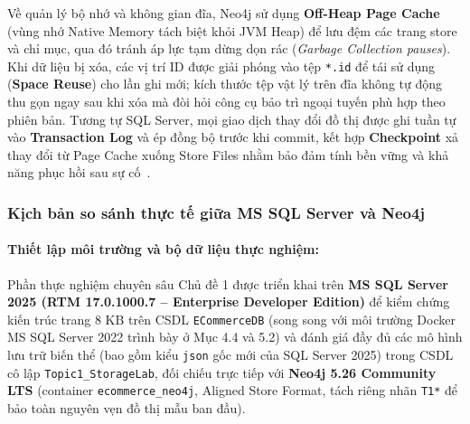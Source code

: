 Về quản lý bộ nhớ và không gian đĩa, Neo4j sử dụng \textbf{Off-Heap Page Cache} (vùng nhớ Native Memory tách biệt khỏi JVM Heap) để lưu đệm các trang store và chỉ mục, qua đó tránh áp lực tạm dừng dọn rác (\textit{Garbage Collection pauses}). Khi dữ liệu bị xóa, các vị trí ID được giải phóng vào tệp \texttt{*.id} để tái sử dụng (\textbf{Space Reuse}) cho lần ghi mới; kích thước tệp vật lý trên đĩa không tự động thu gọn ngay sau khi xóa mà đòi hỏi công cụ bảo trì ngoại tuyến phù hợp theo phiên bản. Tương tự SQL Server, mọi giao dịch thay đổi đồ thị được ghi tuần tự vào \textbf{Transaction Log} và ép đồng bộ trước khi commit, kết hợp \textbf{Checkpoint} xả thay đổi từ Page Cache xuống Store Files nhằm bảo đảm tính bền vững và khả năng phục hồi sau sự cố~\cite{t1_neo4jops}.

\subsubsection{Kịch bản so sánh thực tế giữa MS SQL Server và Neo4j}

\paragraph{Thiết lập môi trường và bộ dữ liệu thực nghiệm:}
Phần thực nghiệm chuyên sâu Chủ đề 1 được triển khai trên \textbf{MS SQL Server 2025 (RTM 17.0.1000.7 -- Enterprise Developer Edition)} để kiểm chứng kiến trúc trang 8 KB trên CSDL \texttt{ECommerceDB} (song song với môi trường Docker MS SQL Server 2022 trình bày ở Mục 4.4 và 5.2) và đánh giá đầy đủ các mô hình lưu trữ biến thể (bao gồm kiểu \texttt{json} gốc mới của SQL Server 2025) trong CSDL cô lập \texttt{Topic1\_StorageLab}, đối chiếu trực tiếp với \textbf{Neo4j 5.26 Community LTS} (container \texttt{ecommerce\_neo4j}, Aligned Store Format, tách riêng nhãn \texttt{T1*} để bảo toàn nguyên vẹn đồ thị mẫu ban đầu).

